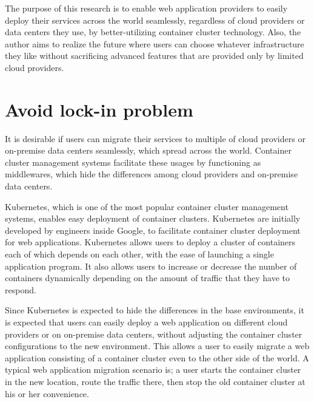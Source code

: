 The purpose of this research is to enable web application providers to easily deploy their services across the world seamlessly, regardless of cloud providers or data centers they use, by better-utilizing container cluster technology. 
Also, the author aims to realize the future where users can choose whatever infrastructure they like without sacrificing advanced features that are provided only by limited cloud providers.

\section{Avoid lock-in problem}

It is desirable if users can migrate their services to multiple of cloud providers or on-premise data centers seamlessly, which spread across the world.
Container cluster management systems facilitate these usages by functioning as middlewares, which hide the differences among cloud providers and on-premise data centers.

Kubernetes\cite{K8s2017}, which is one of the most popular container cluster management systems, enables easy deployment of container clusters.
Kubernetes are initially developed by engineers inside Google, to facilitate container cluster deployment for web applications.
Kubernetes allows users to deploy a cluster of containers each of which depends on each other, with the ease of launching a single application program.
It also allows users to increase or decrease the number of containers dynamically depending on the amount of traffic that they have to respond.

Since Kubernetes is expected to hide the differences in the base environments, it is expected that users can easily deploy a web application on different cloud providers or on on-premise data centers, without adjusting the container cluster configurations to the new environment. 
This allows a user to easily migrate a web application consisting of a container cluster even to the other side of the world.
A typical web application migration scenario is; 
a user starts the container cluster in the new location, route the traffic there, then stop the old container cluster at his or her convenience.

